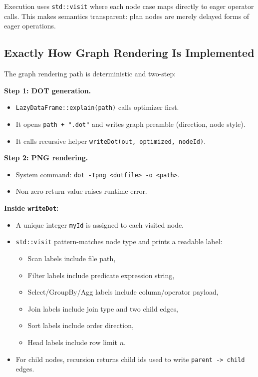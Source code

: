 \documentclass[11pt,a4paper]{article}
\begin{document}
Execution uses \texttt{std::visit} where each node case maps directly to eager operator calls. This makes semantics transparent: plan nodes are merely delayed forms of eager operations.

\subsection{Exactly How Graph Rendering Is Implemented}
The graph rendering path is deterministic and two-step:

\textbf{Step 1: DOT generation.}
\begin{itemize}[leftmargin=*]
	\item \texttt{LazyDataFrame::explain(path)} calls optimizer first.
	\item It opens \texttt{path + ".dot"} and writes graph preamble (direction, node style).
	\item It calls recursive helper \texttt{writeDot(out, optimized, nodeId)}.
\end{itemize}

\textbf{Step 2: PNG rendering.}
\begin{itemize}[leftmargin=*]
	\item System command: \texttt{dot -Tpng <dotfile> -o <path>}.
	\item Non-zero return value raises runtime error.
\end{itemize}

\textbf{Inside \texttt{writeDot}:}
\begin{itemize}[leftmargin=*]
	\item A unique integer \texttt{myId} is assigned to each visited node.
	\item \texttt{std::visit} pattern-matches node type and prints a readable label:
	\begin{itemize}[leftmargin=*]
		\item Scan labels include file path,
		\item Filter labels include predicate expression string,
		\item Select/GroupBy/Agg labels include column/operator payload,
		\item Join labels include join type and two child edges,
		\item Sort labels include order direction,
		\item Head labels include row limit \(n\).
	\end{itemize}
	\item For child nodes, recursion returns child ids used to write \texttt{parent -> child} edges.
\end{itemize}
\end{document}

